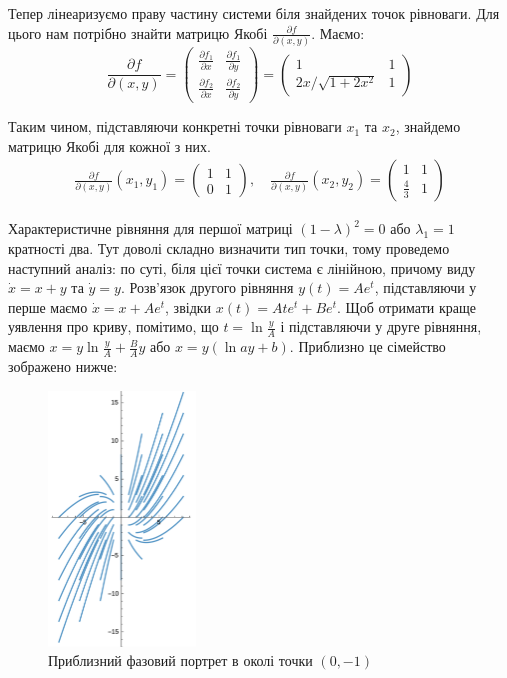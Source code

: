 \documentclass{hw_template}
\begin{document}
Тепер лінеаризуємо праву частину системи біля знайдених точок рівноваги.
Для цього нам потрібно знайти матрицю Якобі $\frac{\partial f}{\partial
(x,y)}$. Маємо:
\begin{equation*}
    \frac{\partial f}{\partial(x,y)} =
    \begin{pmatrix}
        \frac{\partial f_1}{\partial x} & \frac{\partial f_1}{\partial y} \\
        \frac{\partial f_2}{\partial x} & \frac{\partial f_2}{\partial y}
    \end{pmatrix} = \begin{pmatrix}
        1 & 1 \\
        2x/\sqrt{1+2x^2} & 1
    \end{pmatrix}
\end{equation*}

Таким чином, підставляючи конкретні точки рівноваги $x_1$ та $x_2$, знайдемо
матрицю Якобі для кожної з них.
\begin{gather*}
    \frac{\partial f}{\partial(x,y)}(x_1,y_1) = 
    \begin{pmatrix}
        1 & 1 \\
        0 & 1
    \end{pmatrix}, \quad
    \frac{\partial f}{\partial(x,y)}(x_2,y_2) = 
    \begin{pmatrix}
        1 & 1 \\
        \frac{4}{3} & 1
    \end{pmatrix}
\end{gather*}

Характеристичне рівняння для першої матриці $(1-\lambda)^2 =0$ або $\lambda_1 =
1$ кратності два. Тут доволі складно визначити тип точки, тому проведемо
наступний аналіз: по суті, біля цієї точки система є лінійною, причому виду
$\dot{x}=x+y$ та $\dot{y}=y$. Розв'язок другого рівняння $y(t)=Ae^t$,
підставляючи у перше маємо $\dot{x}=x+Ae^t$, звідки $x(t)=Ate^t + Be^t$. Щоб
отримати краще уявлення про криву, помітимо, що $t = \ln \frac{y}{A}$ і
підставляючи у друге рівняння, маємо $x = y \ln \frac{y}{A} + \frac{B}{A}y$ або
$x=y (\ln ay + b)$. Приблизно це сімейство зображено нижче:
\begin{figure}[h!]
    \centering
    \includegraphics[width=0.35\textwidth]{images/test_2_problem_3_1.png}
    \caption{Приблизний фазовий портрет в околі точки $(0,-1)$}
\end{figure}
\end{document}
